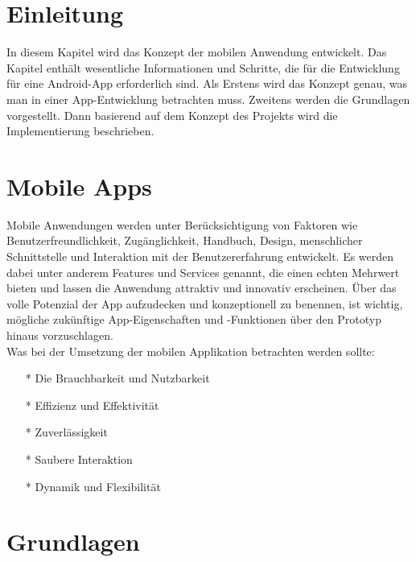 \section{Einleitung}
In diesem Kapitel wird das Konzept der mobilen Anwendung entwickelt. 
Das Kapitel enthält wesentliche Informationen und Schritte, die für die Entwicklung für eine Android-App erforderlich sind. 
Als Erstens wird das Konzept genau, was man in einer App-Entwicklung betrachten muss. Zweitens werden die Grundlagen vorgestellt.
Dann basierend auf dem Konzept des Projekts wird die Implementierung beschrieben.
\section{Mobile Apps}
Mobile Anwendungen werden unter Berücksichtigung von Faktoren wie Benutzerfreundlichkeit, Zugänglichkeit, Handbuch, Design, menschlicher Schnittstelle und Interaktion mit der Benutzererfahrung entwickelt. 
Es werden dabei unter anderem Features und Services genannt, die einen echten Mehrwert bieten und lassen die Anwendung attraktiv und innovativ erscheinen.
Über das volle Potenzial der App aufzudecken und konzeptionell zu benennen, ist wichtig, mögliche zukünftige App-Eigenschaften und -Funktionen über den Prototyp hinaus vorzuschlagen.\\
Was bei der Umsetzung der mobilen Applikation betrachten werden sollte:
\begin{itemize}
\item[*] Die Brauchbarkeit und Nutzbarkeit 
\item[*] Effizienz und Effektivität
\item[*] Zuverlässigkeit
\item[*] Saubere Interaktion
\item[*] Dynamik und Flexibilität
\end{itemize}
\section{Grundlagen}

